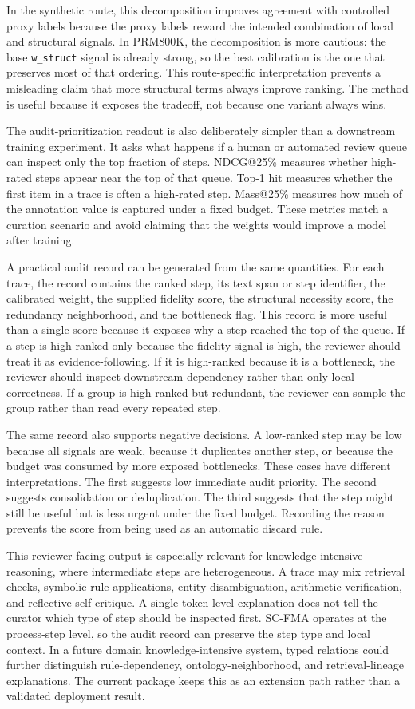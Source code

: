 \documentclass[a4paper,fleqn]{cas-sc}
\begin{document}
In the synthetic route, this decomposition improves agreement with controlled proxy labels because the proxy labels reward the intended combination of local and structural signals. In PRM800K, the decomposition is more cautious: the base \texttt{w\_struct} signal is already strong, so the best calibration is the one that preserves most of that ordering. This route-specific interpretation prevents a misleading claim that more structural terms always improve ranking. The method is useful because it exposes the tradeoff, not because one variant always wins.

The audit-prioritization readout is also deliberately simpler than a downstream training experiment. It asks what happens if a human or automated review queue can inspect only the top fraction of steps. NDCG@25\% measures whether high-rated steps appear near the top of that queue. Top-1 hit measures whether the first item in a trace is often a high-rated step. Mass@25\% measures how much of the annotation value is captured under a fixed budget. These metrics match a curation scenario and avoid claiming that the weights would improve a model after training.

A practical audit record can be generated from the same quantities. For each trace, the record contains the ranked step, its text span or step identifier, the calibrated weight, the supplied fidelity score, the structural necessity score, the redundancy neighborhood, and the bottleneck flag. This record is more useful than a single score because it exposes why a step reached the top of the queue. If a step is high-ranked only because the fidelity signal is high, the reviewer should treat it as evidence-following. If it is high-ranked because it is a bottleneck, the reviewer should inspect downstream dependency rather than only local correctness. If a group is high-ranked but redundant, the reviewer can sample the group rather than read every repeated step.

The same record also supports negative decisions. A low-ranked step may be low because all signals are weak, because it duplicates another step, or because the budget was consumed by more exposed bottlenecks. These cases have different interpretations. The first suggests low immediate audit priority. The second suggests consolidation or deduplication. The third suggests that the step might still be useful but is less urgent under the fixed budget. Recording the reason prevents the score from being used as an automatic discard rule.

This reviewer-facing output is especially relevant for knowledge-intensive reasoning, where intermediate steps are heterogeneous. A trace may mix retrieval checks, symbolic rule applications, entity disambiguation, arithmetic verification, and reflective self-critique. A single token-level explanation does not tell the curator which type of step should be inspected first. SC-FMA operates at the process-step level, so the audit record can preserve the step type and local context. In a future domain knowledge-intensive system, typed relations could further distinguish rule-dependency, ontology-neighborhood, and retrieval-lineage explanations. The current package keeps this as an extension path rather than a validated deployment result.
\end{document}
